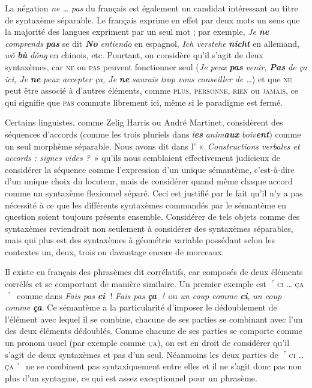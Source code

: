 {     La négation \textit{ne … pas} du français est également un candidat intéressant au titre de syntaxème séparable. Le français exprime en effet par deux mots un sens que la majorité des langues expriment par un seul mot ; par exemple, \textit{Je} \textbf{\textit{ne}} \textit{comprends} \textbf{\textit{pas}} se dit \textbf{\textit{No}} \textit{entiendo} en espagnol, \textit{Ich verstehe} \textbf{\textit{nicht}} en allemand, \textit{wǒ} \textbf{\textit{bù}} \textit{dǒng} en chinois, etc. Pourtant, on considère qu’il s’agit de deux syntaxèmes, car \textsc{ne} ou \textsc{pas} peuvent fonctionner seul (\textit{Je peux} \textbf{\textit{pas}} \textit{venir,} \textbf{\textit{Pas}} \textit{de ça ici, Je} \textbf{\textit{ne}} \textit{peux accepter ça, Je} \textbf{\textit{ne}} \textit{saurais trop vous conseiller de …}) et que \textsc{ne} peut être associé à d’autres éléments, comme \textsc{plus,} \textsc{personne,} \textsc{rien} ou \textsc{jamais}, ce qui signifie que \textsc{pas} commute librement ici, même si le paradigme est fermé.

     Certains linguistes, comme Zelig Harris ou André Martinet, considèrent des séquences d’accords (comme les trois pluriels dans \textit{l}\textbf{\textit{es}} \textit{anim}\textbf{\textit{aux}} \textit{boiv}\textbf{\textit{ent}}) comme un seul morphème séparable. Nous avons dit dans l’ «~\textit{Constructions verbales et accords : signes vides ?}~» qu’ils nous semblaient effectivement judicieux de considérer la séquence comme l’expression d’un unique sémantème, c’est-à-dire d’un unique choix du locuteur, mais de considérer quand même chaque accord comme un syntaxème flexionnel séparé. Ceci est justifié par le fait qu’il n’y a pas nécessité à ce que les différents syntaxèmes commandés par le sémantème en question soient toujours présents ensemble. Considérer de tels objets comme des syntaxèmes reviendrait non seulement à considérer des syntaxèmes séparables, mais qui plus est des syntaxèmes à géométrie variable possédant selon les contextes un, deux, trois ou davantage encore de morceaux.

    Il existe en français des phrasèmes dit corrélatifs, car composés de deux éléments corrélés et se comportant de manière similaire. Un premier exemple est \textrm{$⌜$}\textsc{ci} \textsc{…} \textsc{ça}\textrm{$⌝$}~comme dans \textit{Fais pas} \textbf{\textit{ci~}}! \textit{Fais pas} \textbf{\textit{ça~}}\textit{!~}ou \textit{un coup comme} \textbf{\textit{ci}}, \textit{un coup comme} \textbf{\textit{ça}}. Ce sémantème a la particularité d’imposer le dédoublement de l’élément avec lequel il se combine, chacune de ses parties se combinant avec l’un des deux éléments dédoublés. Comme chacune de ses parties se comporte comme un pronom usuel (par exemple comme \textsc{ça}), on est en droit de considérer qu’il s’agit de deux syntaxèmes et pas d’un seul. Néanmoins les deux parties de \textrm{$⌜$}\textsc{ci} \textsc{…} \textsc{ça}\textrm{$⌝$}~ne se combinent pas syntaxiquement entre elles et il ne s’agit donc pas non plus d’un syntagme, ce qui est assez exceptionnel pour un phrasème.

}
